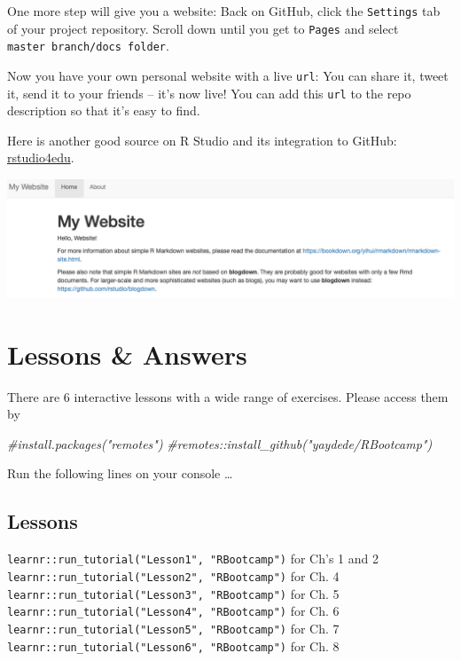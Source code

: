 \documentclass[
]{book}
\newenvironment{Shaded}{\begin{snugshade}}{\end{snugshade}}
\newcommand{\CommentTok}[1]{\textcolor[rgb]{0.56,0.35,0.01}{\textit{#1}}}
\begin{document}
One more step will give you a website: Back on GitHub, click the \texttt{Settings} tab of your project repository. Scroll down until you get to \texttt{Pages} and select \texttt{master\ branch/docs\ folder}.

Now you have your own personal website with a live \texttt{url}: You can share it, tweet it, send it to your friends -- it's now live! You can add this \texttt{url} to the repo description so that it's easy to find.

Here is another good source on R Studio and its integration to GitHub: \href{https://rstudio4edu.github.io/rstudio4edu-book/make-rmd.html}{rstudio4edu}.

\includegraphics[width=14.68in]{png/website}

\hypertarget{lessons-answers}{%
\chapter{Lessons \& Answers}\label{lessons-answers}}

There are 6 interactive lessons with a wide range of exercises. Please access them by

\begin{Shaded}
\begin{Highlighting}[]
\CommentTok{\#install.packages("remotes")}
\CommentTok{\#remotes::install\_github("yaydede/RBootcamp")}
\end{Highlighting}
\end{Shaded}

Run the following lines on your console \ldots{}

\hypertarget{lessons}{%
\section{Lessons}\label{lessons}}

\texttt{learnr::run\_tutorial("Lesson1",\ "RBootcamp")} for Ch's 1 and 2\\
\texttt{learnr::run\_tutorial("Lesson2",\ "RBootcamp")} for Ch. 4\\
\texttt{learnr::run\_tutorial("Lesson3",\ "RBootcamp")} for Ch. 5\\
\texttt{learnr::run\_tutorial("Lesson4",\ "RBootcamp")} for Ch. 6\\
\texttt{learnr::run\_tutorial("Lesson5",\ "RBootcamp")} for Ch. 7\\
\texttt{learnr::run\_tutorial("Lesson6",\ "RBootcamp")} for Ch. 8
\end{document}
